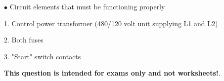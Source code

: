 \medskip
\goodbreak
\item{$\bullet$} Circuit elements that must be functioning properly
\item{1.} Control power transformer (480/120 volt unit supplying L1 and L2)
\item{2.} Both fuses
\item{3.} "Start" switch contacts
\medskip







{\bf This question is intended for exams only and not worksheets!}.




